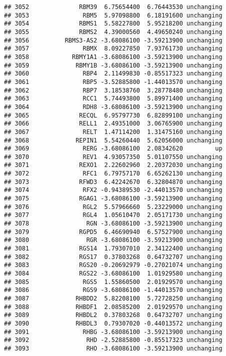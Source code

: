 \documentclass[]{article}
\begin{document}
\begin{verbatim}
## 3052              RBM39  6.75654400  6.76443530 unchanging
## 3053               RBM5  5.97098800  6.18191600 unchanging
## 3054              RBMS1  5.58227800  5.95218200 unchanging
## 3055              RBMS2  4.39000560  4.49650240 unchanging
## 3056          RBMS3-AS2 -3.68086100 -3.59213900 unchanging
## 3057               RBMX  8.09227850  7.93761730 unchanging
## 3058            RBMY1A1 -3.68086100 -3.59213900 unchanging
## 3059             RBMY1B -3.68086100 -3.59213900 unchanging
## 3060               RBP4  2.11499830 -0.85517323 unchanging
## 3061               RBP5 -3.52885800 -1.44013570 unchanging
## 3062               RBP7  3.18538760  3.28778480 unchanging
## 3063               RCC1  5.74493800  5.89971400 unchanging
## 3064               RDH8 -3.68086100 -3.59213900 unchanging
## 3065              RECQL  6.95797730  6.82899100 unchanging
## 3066              RELL1  2.49351000  3.06765900 unchanging
## 3067               RELT  1.47114200  1.31475160 unchanging
## 3068             REPIN1  5.54260440  5.62056000 unchanging
## 3069               RERG -3.68086100  2.08342620         up
## 3070               REV1  4.93057350  5.01107550 unchanging
## 3071              REXO1  2.22602960  2.20372030 unchanging
## 3072               RFC1  6.79757170  6.65262130 unchanging
## 3073              RFWD3  6.42242670  6.32804870 unchanging
## 3074               RFX2 -0.94389530 -2.44013570 unchanging
## 3075              RGAG1 -3.68086100 -3.59213900 unchanging
## 3076               RGL2  5.57966660  5.23229000 unchanging
## 3077               RGL4  1.05610470  2.05171730 unchanging
## 3078                RGN -3.68086100 -3.59213900 unchanging
## 3079              RGPD5  6.46690940  6.57527900 unchanging
## 3080                RGR -3.68086100 -3.59213900 unchanging
## 3081              RGS14  1.79307010  2.34122400 unchanging
## 3082              RGS17  0.37803268  0.64732707 unchanging
## 3083              RGS20 -0.20692979 -0.27021074 unchanging
## 3084              RGS22 -3.68086100  1.01929580 unchanging
## 3085               RGS5  1.55860500  2.01929570 unchanging
## 3086               RGS9 -3.68086100 -1.44013570 unchanging
## 3087             RHBDD2  5.82208100  5.72728250 unchanging
## 3088             RHBDF1  2.08585200  2.01929570 unchanging
## 3089             RHBDL2  0.37803268  0.64732707 unchanging
## 3090             RHBDL3  0.79307020 -0.44013572 unchanging
## 3091               RHBG -3.68086100 -3.59213900 unchanging
## 3092                RHD -2.52885800 -0.85517323 unchanging
## 3093                RHO -3.68086100 -3.59213900 unchanging

\end{verbatim}
\end{document}
